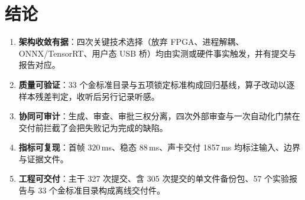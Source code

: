 \documentclass[11pt,a4paper]{ctexart}
\begin{document}
\section{结论}

\begin{enumerate}[leftmargin=1.8em,itemsep=0.3em]
  \item \textbf{架构收敛有据}：四次关键技术选择（放弃 FPGA、进程解耦、ONNX/TensorRT、用户态 USB 桥）均由实测或硬件事实触发，并有提交与报告对应。
  \item \textbf{质量可验证}：33 个金标准目录与五项锁定标准构成回归基线，算子改动以逐样本残差判定，收听后另行记录听感。
  \item \textbf{协同可审计}：生成、审查、审批三权分离，四次外部审查与一次自动化门禁在交付前拦截了会把失败记为完成的缺陷。
  \item \textbf{指标可复现}：首帧 320\,ms、稳态 88\,ms、声卡交付 1857\,ms 均标注输入、边界与证据文件。
  \item \textbf{工程可交付}：主干 327 次提交、含 305 次提交的单文件备份包、57 个实验报告与 33 个金标准目录构成离线交付件。
\end{enumerate}
\end{document}

